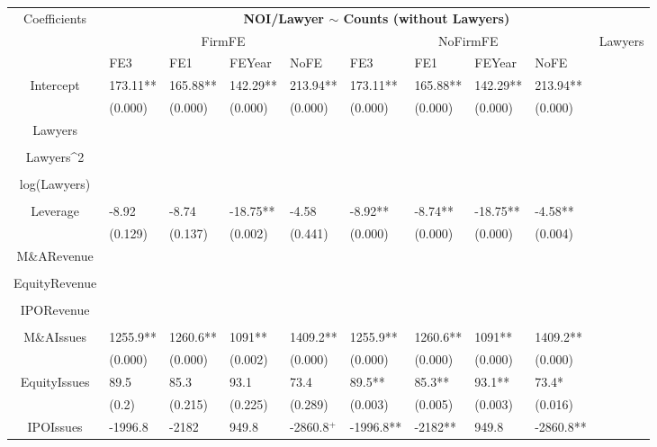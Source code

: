 \documentclass{article}
\begin{document}
\begin{table}[H]
\centering
\begin{tabular}{|clllllllll|}
\hline
\multirow{3}{*}{Coefficients} & \multicolumn{9}{c|}{\textbf{NOI/Lawyer $\sim$ Counts (without Lawyers)}} \\
\cline{2-10}
& \multicolumn{4}{c}{FirmFE} & \multicolumn{4}{c}{NoFirmFE} & \multirow{2}{*}{Lawyers} \\
\cline{2-9}
& FE3 & FE1 & FEYear & NoFE & FE3 & FE1 & FEYear & NoFE &  \\
\hline
 
Intercept & 173.11** & 165.88** & 142.29** & 213.94** & 173.11** & 165.88** & 142.29** & 213.94** & \\ 
   & (0.000) & (0.000) & (0.000) & (0.000) & (0.000) & (0.000) & (0.000) & (0.000) & \\ 
  Lawyers &  &  &  &  &  &  &  &  & \\ 
   &  &  &  &  &  &  &  &  & \\ 
  Lawyers^2 &  &  &  &  &  &  &  &  & \\ 
   &  &  &  &  &  &  &  &  & \\ 
  log(Lawyers) &  &  &  &  &  &  &  &  & \\ 
   &  &  &  &  &  &  &  &  & \\ 
  Leverage & -8.92 & -8.74 & -18.75** & -4.58 & -8.92** & -8.74** & -18.75** & -4.58** & \\ 
   & (0.129) & (0.137) & (0.002) & (0.441) & (0.000) & (0.000) & (0.000) & (0.004) & \\ 
  M\&ARevenue &  &  &  &  &  &  &  &  & \\ 
   &  &  &  &  &  &  &  &  & \\ 
  EquityRevenue &  &  &  &  &  &  &  &  & \\ 
   &  &  &  &  &  &  &  &  & \\ 
  IPORevenue &  &  &  &  &  &  &  &  & \\ 
   &  &  &  &  &  &  &  &  & \\ 
  M\&AIssues & 1255.9** & 1260.6** & 1091** & 1409.2** & 1255.9** & 1260.6** & 1091** & 1409.2** & \\ 
   & (0.000) & (0.000) & (0.002) & (0.000) & (0.000) & (0.000) & (0.000) & (0.000) & \\ 
  EquityIssues & 89.5 & 85.3 & 93.1 & 73.4 & 89.5** & 85.3** & 93.1** & 73.4* & \\ 
   & (0.2) & (0.215) & (0.225) & (0.289) & (0.003) & (0.005) & (0.003) & (0.016) & \\ 
  IPOIssues & -1996.8 & -2182 & 949.8 & -2860.8$^{+}$ & -1996.8** & -2182** & 949.8 & -2860.8** & \\ 

\end{tabular}
\end{table}
\end{document}
